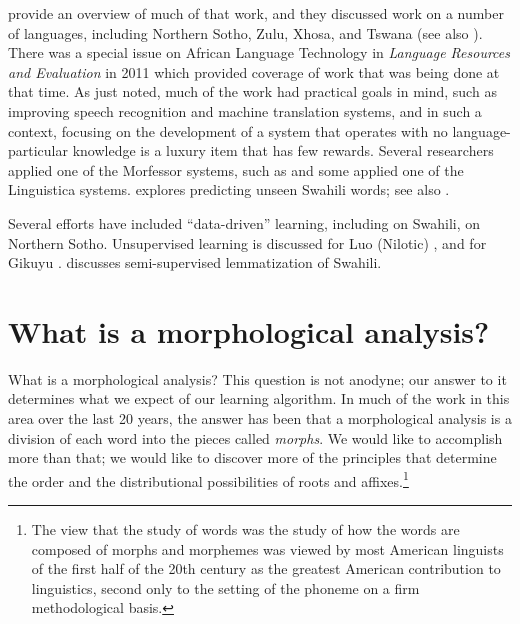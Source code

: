 \documentclass[output=paper,colorlinks,citecolor=brown]{langscibook}
\begin{document}
\citet{DePauwDeSchryver2008} provide an overview of much of that work, and they discussed work on a number of languages, including Northern Sotho, Zulu, Xhosa, and Tswana (see also \citealt{DePauwEtAl2009}). There was a special issue on African Language Technology in \textit{Language Resources and Evaluation} in 2011 which provided coverage of work that was being done at that time.  As just noted, much of the work had practical goals in mind, such as improving speech recognition \citep{GelasEtAl2012} and machine translation systems, and in such a context, focusing on the development of a system that operates with no language-particular knowledge is a luxury item that has few rewards. Several researchers applied one of the Morfessor systems, such as \citet{GelasEtAl2012} and some applied one of the Linguistica systems.  \citet{Linden2008} explores predicting unseen Swahili words; see also \citet{Muhirwe2007}.

 


Several efforts have included ``data-driven'' learning, including  \citet{DePauwEtAl2006} on Swahili, \citet{DeSchryverDePauw2007} on  Northern Sotho. Unsupervised learning is discussed for  Luo (Nilotic) \citet{de2007unsupervised},  and for Gikuyu \citet{DePauwWagacha2007}. \citet{Linden2008} discusses semi-supervised lemmatization of Swahili.
   

\section{What is a morphological analysis?}

What is a morphological analysis? This question is not anodyne; our answer to it determines what we expect of our learning algorithm. In much of the work in this area over the last 20 years, the answer has been that a morphological analysis is a division of each word into the pieces called \textit{morphs}. We would like to accomplish more than that; we would like to discover more of the principles that determine the order and the distributional possibilities of roots and affixes.\footnote{The view that the study of words was the study of how the words are composed of morphs and morphemes was viewed by most American linguists of the first half of the 20th century as the greatest American contribution to linguistics, second only to the setting of the phoneme on a firm methodological basis.}  
\end{document}
